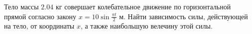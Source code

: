 Тело массы $2.04$ кг совершает колебательное движение
по горизонтальной прямой согласно закону
$x = 10\sin{\frac{\pi t}{2}}$ м.
Найти зависимость силы, действующей на тело, от координаты $x$,
а также наибольшую велечину этой силы.
